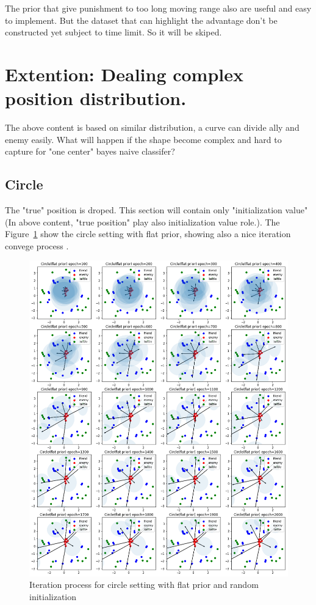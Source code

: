 \documentclass{article}
\begin{document}
The prior that give punishment to too long moving range also are useful and easy to implement. 
But the dataset that can highlight the advantage don't be constructed yet subject to time limit.
So it will be skiped.

\section{Extention: Dealing complex position distribution.}

The above content is based on similar distribution, a curve can divide ally and enemy easily.
What will happen if the shape become complex and hard to capture for "one center" bayes naive classifer?

\subsection{Circle}

The "true" position is droped. This section will contain only "initialization value"
(In above content, "true position" play also initialization value role.). 
The Figure~\ref{fig:circleIteration} show the circle setting with flat prior, 
showing also a nice iteration convege process .


\begin{figure}[h]
\includegraphics[width=0.99\linewidth]{circle_iteration.png}
\caption{Iteration process for circle setting with flat prior and random initialization}
\label{fig:circleIteration}
\end{figure}
\end{document}
